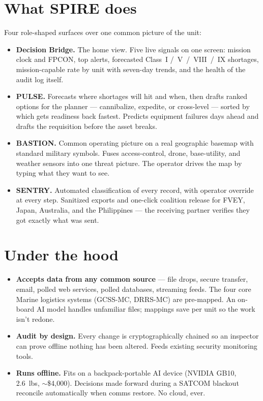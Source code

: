 \documentclass[10.5pt]{extarticle}
\begin{document}
\section*{What SPIRE does}
Four role-shaped surfaces over one common picture of the unit:
\begin{itemize}
  \item \textbf{Decision Bridge.} The home view. Five live signals on
    one screen: mission clock and FPCON, top alerts, forecasted Class~I
    /~V~/~VIII~/~IX shortages, mission-capable rate by unit with
    seven-day trends, and the health of the audit log itself.
  \item \textbf{PULSE.} Forecasts where shortages will hit and when,
    then drafts ranked options for the planner --- cannibalize,
    expedite, or cross-level --- sorted by which gets readiness back
    fastest. Predicts equipment failures days ahead and drafts the
    requisition before the asset breaks.
  \item \textbf{BASTION.} Common operating picture on a real geographic
    basemap with standard military symbols. Fuses access-control,
    drone, base-utility, and weather sensors into one threat picture.
    The operator drives the map by typing what they want to see.
  \item \textbf{SENTRY.} Automated classification of every record, with
    operator override at every step. Sanitized exports and one-click
    coalition release for FVEY, Japan, Australia, and the Philippines
    --- the receiving partner verifies they got exactly what was sent.
\end{itemize}

\section*{Under the hood}
\begin{itemize}
  \item \textbf{Accepts data from any common source} --- file drops,
    secure transfer, email, polled web services, polled databases,
    streaming feeds. The four core Marine logistics systems (GCSS-MC,
    DRRS-MC) are pre-mapped. An on-board AI model handles unfamiliar
    files; mappings save per unit so the work isn't redone.
  \item \textbf{Audit by design.} Every change is cryptographically
    chained so an inspector can prove offline nothing has been altered.
    Feeds existing security monitoring tools.
  \item \textbf{Runs offline.} Fits on a backpack-portable AI device
    (NVIDIA GB10, 2.6~lbs, $\sim$\$4{,}000). Decisions made forward
    during a SATCOM blackout reconcile automatically when comms restore.
    No cloud, ever.
\end{itemize}
\end{document}

